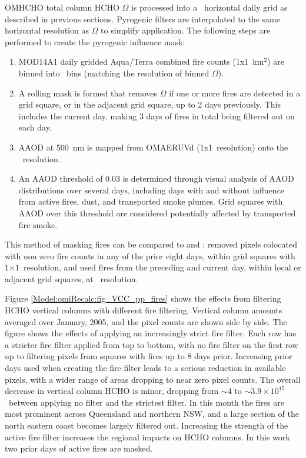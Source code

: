     OMHCHO total column HCHO $\Omega$ is processed into a \highhr ~horizontal daily grid as described in previous sections.
    Pyrogenic filters are interpolated to the same horizontal resolution as $\Omega$ to simplify application. 
    The following steps are performed to create the pyrogenic influence mask:
    \begin{enumerate}
      \item MOD14A1 daily gridded Aqua/Terra combined fire counts (1x1~km$^2$) are binned into \highhr ~bins (matching the resolution of binned $\Omega$).
      \item A rolling mask is formed that removes $\Omega$ if one or more fires are detected in a grid square, or in the adjacent grid square, up to 2 days previously.
      This includes the current day, making 3 days of fires in total being filtered out on each day.
      \item AAOD at 500~nm is mapped from OMAERUVd (1x1\degr ~resolution) onto the \highhr ~resolution.
      \item An AAOD threshold of 0.03 is determined through visual analysis of AAOD distributions over several days, including days with and without influence from active fires, dust, and transported smoke plumes. 
      Grid squares with AAOD over this threshold are considered potentially affected by transported fire smoke.
    \end{enumerate}
    This method of masking fires can be compared to \textcite{Marais2012} and \textcite{Barkley2013}:
    \textcite{Marais2012} removed pixels colocated with non zero fire counts in any of the prior eight days, within grid squares with 1\degr$\times 1$\degr ~resolution, and \textcite{Barkley2013} used fires from the preceding and current day, within local or adjacent grid squares, at \highhr ~resolution.
    
    
    Figure \ref{Model:omiRecalc:fig_VCC_pp_fires} shows the effects from filtering HCHO vertical columns with different fire filtering.
    Vertical column amounts averaged over January, 2005, and the pixel counts are shown side by side.
    The figure shows the effects of applying an increasingly strict fire filter.
    Each row has a stricter fire filter applied from top to bottom, with no fire filter on the first row up to filtering pixels from squares with fires up to 8 days prior.
    Increasing prior days used when creating the fire filter leads to a serious reduction in available pixels, with a wider range of areas dropping to near zero pixel counts.
    The overall decrease in vertical column HCHO is minor, dropping from $\sim{4}$ to $\sim{3.9} \times 10^{15}$  \moleccm ~between applying no filter and the strictest filter.
    In this month the fires are most prominent across Queensland and northern NSW, and a large section of the north eastern coast becomes largely filtered out.
    Increasing the strength of the active fire filter increases the regional impacts on HCHO columns.
    In this work two prior days of active fires are masked.
    
